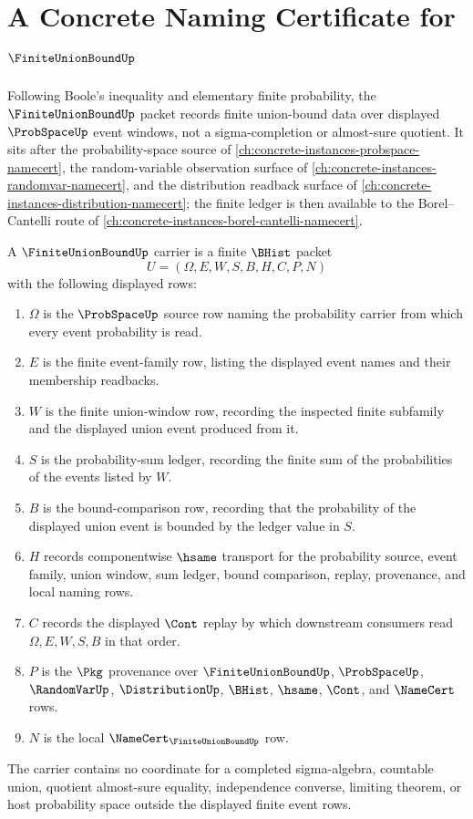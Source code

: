 \chapter{A Concrete Naming Certificate for $\FiniteUnionBoundUp$}
\label{ch:concrete-instances-finite-union-bound-namecert}

Following Boole's inequality and elementary finite probability, the $\FiniteUnionBoundUp$ packet records finite union-bound data over displayed $\ProbSpaceUp$ event windows, not a sigma-completion or almost-sure quotient. It sits after the probability-space source of \autoref{ch:concrete-instances-probspace-namecert}, the random-variable observation surface of \autoref{ch:concrete-instances-randomvar-namecert}, and the distribution readback surface of \autoref{ch:concrete-instances-distribution-namecert}; the finite ledger is then available to the Borel--Cantelli route of \autoref{ch:concrete-instances-borel-cantelli-namecert}.

\begin{definition}
\label{def:finite-union-bound-carrier}
A $\FiniteUnionBoundUp$ carrier is a finite $\BHist$ packet
$$
U=(\Omega,E,W,S,B,H,C,P,N)
$$
with the following displayed rows:
\begin{enumerate}
\item $\Omega$ is the $\ProbSpaceUp$ source row naming the probability carrier from which every event probability is read.
\item $E$ is the finite event-family row, listing the displayed event names and their membership readbacks.
\item $W$ is the finite union-window row, recording the inspected finite subfamily and the displayed union event produced from it.
\item $S$ is the probability-sum ledger, recording the finite sum of the probabilities of the events listed by $W$.
\item $B$ is the bound-comparison row, recording that the probability of the displayed union event is bounded by the ledger value in $S$.
\item $H$ records componentwise $\hsame$ transport for the probability source, event family, union window, sum ledger, bound comparison, replay, provenance, and local naming rows.
\item $C$ records the displayed $\Cont$ replay by which downstream consumers read $\Omega,E,W,S,B$ in that order.
\item $P$ is the $\Pkg$ provenance over $\FiniteUnionBoundUp$, $\ProbSpaceUp$, $\RandomVarUp$, $\DistributionUp$, $\BHist$, $\hsame$, $\Cont$, and $\NameCert$ rows.
\item $N$ is the local $\NameCert_{\FiniteUnionBoundUp}$ row.
\end{enumerate}
The carrier contains no coordinate for a completed sigma-algebra, countable union, quotient almost-sure equality, independence converse, limiting theorem, or host probability space outside the displayed finite event rows.
\end{definition}

